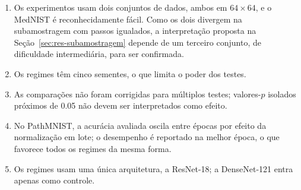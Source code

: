 \begin{enumerate}
  \item Os experimentos usam dois conjuntos de dados, ambos em
        $64 \times 64$, e o MedNIST é reconhecidamente fácil. Como os dois
        divergem na subamostragem com passos igualados, a interpretação
        proposta na Seção~\ref{sec:res-subamostragem} depende de um terceiro
        conjunto, de dificuldade intermediária, para ser confirmada.
  \item Os regimes têm cinco sementes, o que limita o poder dos testes.
  \item As comparações não foram corrigidas para múltiplos testes; valores-$p$
        isolados próximos de \num{0,05} não devem ser interpretados como
        efeito.
  \item No PathMNIST, a acurácia avaliada oscila entre épocas por efeito da
        normalização em lote; o desempenho é reportado na melhor época, o que
        favorece todos os regimes da mesma forma.
  \item Os regimes usam uma única arquitetura, a ResNet-18; a DenseNet-121
        entra apenas como controle.
\end{enumerate}
